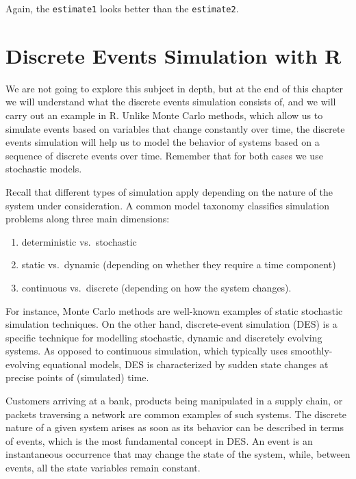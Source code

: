 \documentclass[
]{book}
\providecommand{\tightlist}{%
  \setlength{\itemsep}{0pt}\setlength{\parskip}{0pt}}
\begin{document}
Again, the \texttt{estimate1} looks better than the \texttt{estimate2}.

\hypertarget{discrete-events-simulation-with-r}{%
\chapter{Discrete Events Simulation with R}\label{discrete-events-simulation-with-r}}

We are not going to explore this subject in depth, but at the end of this chapter we will understand what the discrete events simulation consists of, and we will carry out an example in R. Unlike Monte Carlo methods, which allow us to simulate events based on variables that change constantly over time, the discrete events simulation will help us to model the behavior of systems based on a sequence of discrete events over time. Remember that for both cases we use stochastic models.

Recall that different types of simulation apply depending on the nature of the system under consideration. A common model taxonomy classifies simulation problems along three main dimensions:

\begin{enumerate}
\def\labelenumi{\arabic{enumi}.}
\tightlist
\item
  deterministic vs.~stochastic
\item
  static vs.~dynamic (depending on whether they require a time component)
\item
  continuous vs.~discrete (depending on how the system changes).
\end{enumerate}

For instance, Monte Carlo methods are well-known examples of static stochastic simulation techniques. On the other hand, discrete-event simulation (DES) is a specific technique for modelling stochastic, dynamic and discretely evolving systems. As opposed to continuous simulation, which typically uses smoothly-evolving equational models, DES is characterized by sudden state changes at precise points of (simulated) time.

Customers arriving at a bank, products being manipulated in a supply chain, or packets traversing a network are common examples of such systems. The discrete nature of a given system arises as soon as its behavior can be described in terms of events, which is the most fundamental concept in DES. An event is an instantaneous occurrence that may change the state of the system, while, between events, all the state variables remain constant.
\end{document}
